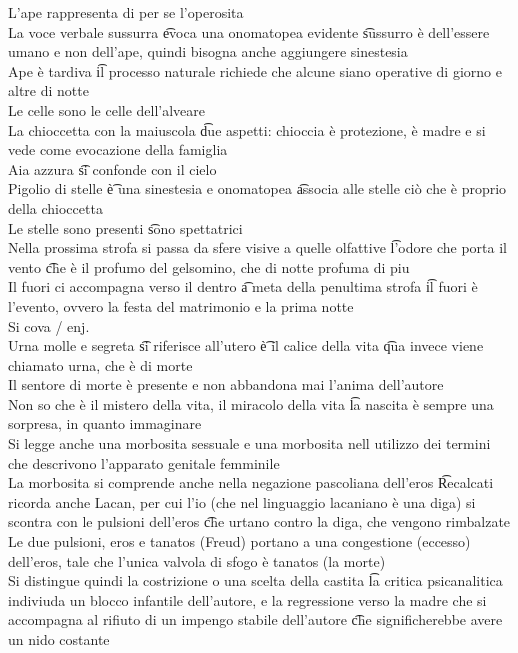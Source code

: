 \documentclass[12pt]{article}
\begin{document}
L'ape rappresenta di per se l'operosita \\
La voce verbale sussurra \t evoca una onomatopea evidente \t sussurro è dell'essere umano e non dell'ape, quindi bisogna anche aggiungere sinestesia \\
Ape è tardiva \t il processo naturale richiede che alcune siano operative di giorno e altre di notte \\
Le celle sono le celle dell'alveare \\
La chioccetta con la maiuscola \t due aspetti: chioccia è protezione, è madre e si vede come evocazione della famiglia \\
Aia azzura \t si confonde con il cielo \\
Pigolio di stelle \t è una sinestesia e onomatopea \t associa alle stelle ciò che è proprio della chioccetta \\
Le stelle sono presenti \t sono spettatrici \\
Nella prossima strofa si passa da sfere visive a quelle olfattive \t l'odore che porta il vento \t che è il profumo del gelsomino, che di notte profuma di piu \\
Il fuori ci accompagna verso il dentro \t a meta della penultima strofa \t il fuori è l'evento, ovvero la festa del matrimonio e la prima notte \\
Si cova / enj. \\
Urna molle e segreta \t si riferisce all'utero \t è il calice della vita \t qua invece viene chiamato urna, che è di morte \\
Il sentore di morte è presente e non abbandona mai l'anima dell'autore \\
Non so che è il mistero della vita, il miracolo della vita \t la nascita è sempre una sorpresa, in quanto immaginare \\
Si legge anche una morbosita sessuale e una morbosita nell utilizzo dei termini che descrivono l'apparato genitale femminile \\
La morbosita si comprende anche nella negazione pascoliana dell'eros \t Recalcati ricorda anche Lacan, per cui l'io (che nel linguaggio lacaniano è una diga) si scontra con le pulsioni dell'eros \t che urtano contro la diga, che vengono rimbalzate \\
Le due pulsioni, eros e tanatos (Freud) portano a una congestione (eccesso) dell'eros, tale che l'unica valvola di sfogo è tanatos (la morte) \\
Si distingue quindi la costrizione o una scelta della castita \t la critica psicanalitica indiviuda un blocco infantile dell'autore, e la regressione verso la madre che si accompagna al rifiuto di un impengo stabile dell'autore \t che significherebbe avere un nido costante
\end{document}
